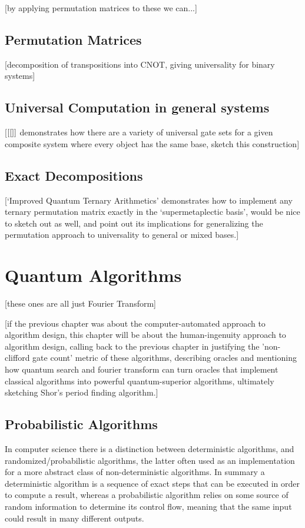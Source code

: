 \documentclass[]{article}
\begin{document}
[by applying permutation matrices to these we can...]
\subsection{Permutation Matrices}
[decomposition of transpositions into CNOT, giving universality for binary systems]
\subsection{Universal Computation in general systems}
[$[\cite]$ demonstrates how there are a variety of universal gate sets for a given composite system where every object has the same base, sketch this construction]
\subsection{Exact Decompositions}
[`Improved Quantum Ternary Arithmetics' demonstrates how to implement any ternary permutation matrix exactly in the `supermetaplectic basis', would be nice to sketch out as well, and point out its implications for generalizing the permutation approach to universality to general or mixed bases.]


\section{Quantum Algorithms}
[these ones are all just Fourier Transform]

[if the previous chapter was about the computer-automated approach to algorithm design, this chapter will be about the human-ingenuity approach to algorithm design, calling back to the previous chapter in justifying the 'non-clifford gate count' metric of these algorithms, describing oracles and mentioning how quantum search and fourier transform can turn oracles that implement classical algorithms into powerful quantum-superior algorithms, ultimately sketching Shor's period finding algorithm.]
\subsection{Probabilistic Algorithms}
In computer science there is a distinction between deterministic algorithms, and randomized/probabilistic algorithms, the latter often used as an implementation for a more abstract class of non-deterministic algorithms. In summary a deterministic algorithm is a sequence of exact steps that can be executed in order to compute a result, whereas a probabilistic algorithm relies on some source of random information to determine its control flow, meaning that the same input could result in many different outputs.
\end{document}
